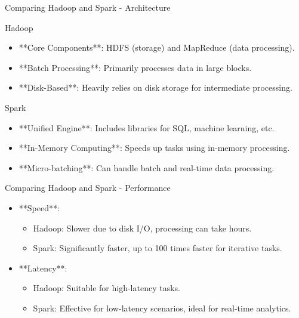 \documentclass[aspectratio=169]{beamer}
\begin{document}
\begin{frame}[fragile]{Comparing Hadoop and Spark - Architecture}
    \begin{block}{Hadoop}
        \begin{itemize}
            \item **Core Components**: HDFS (storage) and MapReduce (data processing).
            \item **Batch Processing**: Primarily processes data in large blocks.
            \item **Disk-Based**: Heavily relies on disk storage for intermediate processing.
        \end{itemize}
    \end{block}
    
    \begin{block}{Spark}
        \begin{itemize}
            \item **Unified Engine**: Includes libraries for SQL, machine learning, etc.
            \item **In-Memory Computing**: Speeds up tasks using in-memory processing.
            \item **Micro-batching**: Can handle batch and real-time data processing.
        \end{itemize}
    \end{block}
\end{frame}

\begin{frame}[fragile]{Comparing Hadoop and Spark - Performance}
    \begin{itemize}
        \item **Speed**:
            \begin{itemize}
                \item Hadoop: Slower due to disk I/O, processing can take hours.
                \item Spark: Significantly faster, up to 100 times faster for iterative tasks.
            \end{itemize}
        
        \item **Latency**:
            \begin{itemize}
                \item Hadoop: Suitable for high-latency tasks.
                \item Spark: Effective for low-latency scenarios, ideal for real-time analytics.
            \end{itemize}
    \end{itemize}
\end{frame}
\end{document}
